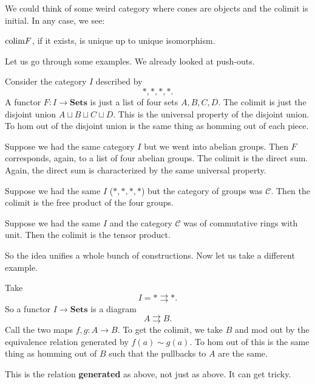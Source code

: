 We could think of some weird category where cones are objects and the colimit
is initial. In any case, we see:

\begin{proposition}
$\mathrm{colim} F$, if it exists, is unique up to unique isomorphism.
\end{proposition}

Let us go through some examples. We already looked at push-outs.

\begin{example}
Consider the category $I$ described by
\[ \ast, \ast, \ast, \ast.  \]
A functor $F: I \to \mathbf{Sets}$ is just a list of four sets $A, B, C, D$.
The colimit is just the disjoint union $A \sqcup B \sqcup C \sqcup D$. This is
the universal property of the disjoint union. To hom out of the disjoint union
is the same thing as homming out of each piece.
\end{example}


\begin{example}
Suppose we had the same category $I$ but we went into abelian groups. Then $F$
corresponds, again, to a list of four abelian groups. The colimit is the direct
sum. Again, the direct sum is characterized by the same universal property.
\end{example}

\begin{example}
Suppose we had the same $I$ ($\ast, \ast, \ast, \ast$) but the category of
groups was $\mathcal{C}$. Then the colimit is the
free product of the four groups.
\end{example}

\begin{example}
Suppose we had the same $I$ and the category $\mathcal{C}$ was of commutative
rings with unit. Then the colimit is the tensor product.
\end{example}

So the idea unifies a whole bunch of constructions.
Now let us take a different example.

\begin{example}
Take
\[ I = \ast \rightrightarrows \ast.  \]
So a functor $I \to \mathbf{Sets}$ is a diagram
\[ A \rightrightarrows B.  \]
Call the two maps $f,g: A \to B$. To get the colimit, we take $B$ and mod out
by the equivalence relation generated by $f(a) \sim g(a)$.
To hom out of this is the same thing as homming  out of $B$ such that the
pullbacks to $A$ are the same.

This is the relation \textbf{generated} as above, not just as above. It can get
tricky.
\end{example}


